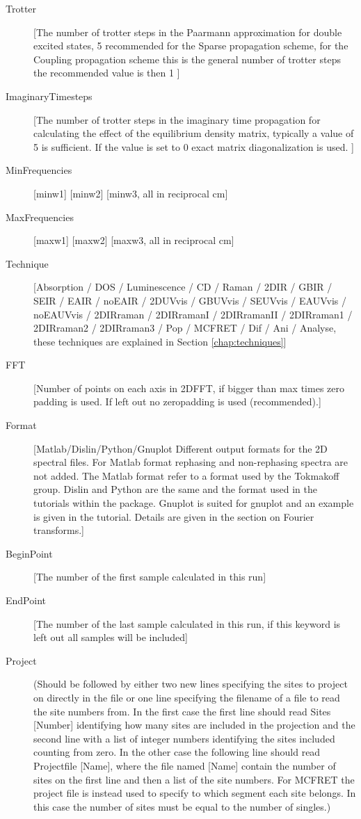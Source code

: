 \begin{description}
\item [Trotter] [The number of trotter steps in the Paarmann approximation for double excited 
states, 5 recommended for the Sparse propagation scheme, for the Coupling propagation scheme this is the general number of trotter steps the recommended value is then 1 ]
\item [ImaginaryTimesteps] [The number of trotter steps in the imaginary time propagation for calculating the effect of the equilibrium density matrix, typically a value of 5 is sufficient. If the value is set to 0 exact matrix diagonalization is used. ]
\item [MinFrequencies] [minw1] [minw2] [minw3, all in reciprocal cm]
\item [MaxFrequencies] [maxw1] [maxw2] [maxw3, all in reciprocal cm]
\item [Technique] [Absorption / DOS / Luminescence / CD / Raman / 2DIR / GBIR / SEIR / EAIR / noEAIR / 2DUVvis / GBUVvis / SEUVvis / EAUVvis / noEAUVvis / 2DIRraman / 2DIRramanI / 2DIRramanII / 2DIRraman1 / 2DIRraman2 / 2DIRraman3 / Pop / MCFRET / Dif / Ani / Analyse, these techniques are explained in Section \ref{chap:techniques}]
\item [FFT] [Number of points on each axis in 2DFFT, if bigger than max times zero padding is used. If left out no zeropadding is used (recommended).]
\item [Format] [Matlab/Dislin/Python/Gnuplot Different output formats for the 2D spectral files. For Matlab format rephasing and non-rephasing spectra are not added. The Matlab format refer to a format used by the Tokmakoff group. Dislin and Python are the same and the format used in the tutorials within the package. Gnuplot is suited for gnuplot and an example is given in the tutorial. Details are given in the section on Fourier transforms.] 
\item [BeginPoint] [The number of the first sample calculated in this run]
\item [EndPoint] [The number of the last sample calculated in this run, if this keyword is left out all samples will be included]
\item [Project] (Should be followed by either two new lines specifying the sites to project on directly in the file or one line specifying the filename of a file to read the site numbers from. In the first case the first line should read Sites [Number] identifying how many sites are included in the projection and the second line with a list of integer numbers identifying the sites included counting from zero. In the other case the following line should read Projectfile [Name], where the file named [Name] contain the number of sites on the first line and then a list of the site numbers. For MCFRET the project file is instead used to specify to which segment each site belongs. In this case the number of sites must be equal to the number of singles.)

\end{description}
